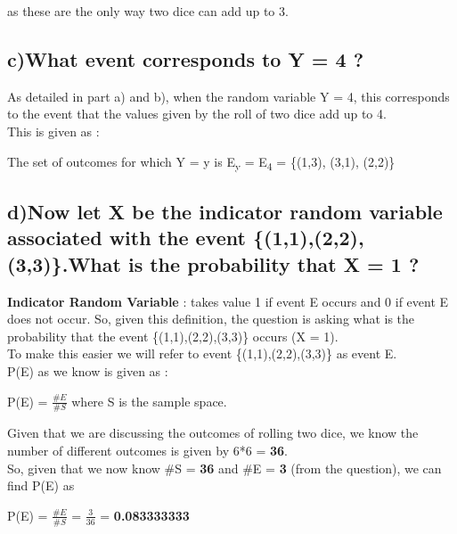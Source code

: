 \documentclass{report}
\begin{document}
        as these are the only way two dice can add up to 3.


			
		\subsection*{c)What event corresponds to Y = 4 ?}
		
			
        As detailed in part a) and b), when the random variable Y = 4, this corresponds to the event that the values given by the roll of two dice add up to 4.\\
        This is given as :

        \begin{center}
            The set of outcomes for which Y = y is E\textsubscript{y} = E\textsubscript{4} = \{(1,3), (3,1), (2,2)\}
        \end{center}






		\subsection*{d)Now let X be the indicator random variable associated with the event \{(1,1),(2,2),(3,3)\}.What is the probability that X = 1 ?}
        \textbf{Indicator Random Variable} :  takes value 1 if event E occurs and 0 if event E does not occur.
        So, given this definition, the question is asking what is the probability that the event \{(1,1),(2,2),(3,3)\} occurs (X = 1).\\
        To make this easier we will refer to event \{(1,1),(2,2),(3,3)\} as event E.\\
        P(E) as we know is given as : 
        
        \begin{center}
            P(E) = $\frac{\#E}{\#S}$ where S is the sample space.
        \end{center}

        Given that we are discussing the outcomes of rolling two dice, we know the number of different outcomes is given by 6*6 = \textbf{36}.\\
        So, given that we now know \#S = \textbf{36} and \#E = \textbf{3} (from the question), we can find P(E) as

        \begin{center}
            P(E) = $\frac{\#E}{\#S}$ = $\frac{3}{36}$ = \textbf{0.083333333}
        \end{center}
\end{document}
